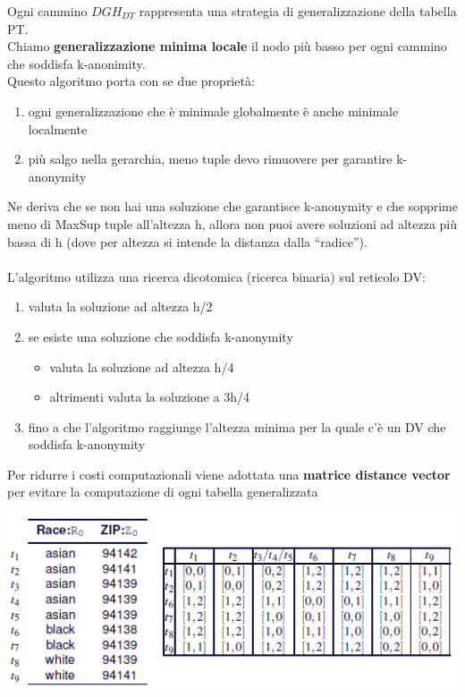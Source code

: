 Ogni cammino \(DGH_{DT}\) rappresenta una strategia di generalizzazione della tabella PT.\\
Chiamo \textbf{generalizzazione minima locale} il nodo più basso per ogni cammino che soddisfa k-anonimity.\\
Questo algoritmo porta con se due proprietà:
\begin{enumerate}
    \item ogni generalizzazione che è minimale globalmente è anche minimale localmente
    \item più salgo nella gerarchia, meno tuple devo rimuovere per garantire k-anonymity
\end{enumerate}
Ne deriva che se non hai una soluzione che garantisce k-anonymity e che sopprime meno di MaxSup tuple all’altezza h, allora non puoi avere soluzioni ad altezza più bassa di h (dove per altezza si intende la distanza dalla “radice”).\\\\
L'algoritmo utilizza una ricerca dicotomica (ricerca binaria) sul reticolo DV:
\begin{enumerate}
    \item valuta la soluzione ad altezza h/2
    \item se esiste una soluzione che soddisfa k-anonymity
    \begin{itemize}
        \item valuta la soluzione ad altezza h/4
        \item altrimenti valuta la soluzione a 3h/4
    \end{itemize}
    \item fino a che l'algoritmo raggiunge l'altezza minima per la quale c'è un DV che soddisfa k-anonymity
\end{enumerate}
Per ridurre i costi computazionali viene adottata una \textbf{matrice distance vector} per evitare la computazione di ogni tabella generalizzata
\begin{center}
    \includegraphics[scale=0.6]{img/dvmatrix.png}
\end{center}
